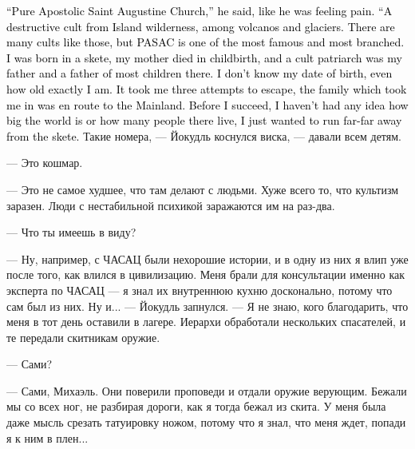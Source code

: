 \documentclass[a4paper,12pt,fleqn]{book}\usepackage{cooltooltips}\usepackage{polyglossia}\setdefaultlanguage[babelshorthands=true]{russian}\setotherlanguage{english}\defaultfontfeatures{Ligatures=TeX,Mapping=tex-text} \usepackage{xcolor}\definecolor{lightgray}{HTML}{bbbbbb}\color{lightgray}\newcommand{\ml}[3]{\textenglish{\textcolor{black}{#3}}}
\begin{document}
\ml{$0$}
{--- Чистоапостольская Церковь Святого Августина, --- сказал он, поморщившись, словно от боли.}
{``Pure Apostolic Saint Augustine Church,'' he said, like he was feeling pain.}
\ml{$0$}
{--- Деструктивный культ в дикой местности Исланда, среди вулканов и ледников.}
{``A destructive cult from Island wilderness, among volcanos and glaciers.}
\ml{$0$}
{Таких культов достаточно много, но ЧАСАЦ --- один из самых известных и разветвлённых.}
{There are many cults like those, but PASAC is one of the most famous and most branched.}
\ml{$0$}
{Я родился в ските, моя мать умерла при родах, а биологическим отцом был глава культа, как и у большинства родившихся там.}
{I was born in a skete, my mother died in childbirth, and a cult patriarch was my father and a father of most children there.}
\ml{$0$}
{Я не знаю, когда я родился и сколько мне в точности лет.}
{I don't know my date of birth, even how old exactly I am.}
\ml{$0$}
{Сбежал с третьей попытки --- меня приютила семья, которая направлялась на Большую Землю.}
{It took me three attempts to escape, the family which took me in was en route to the Mainland.}
\ml{$0$}
{До побега я даже не знал, что вне поселения есть целый мир и множество людей, я просто хотел убежать подальше от скита.}
{Before I succeed, I haven't had any idea how big the world is or how many people there live, I just wanted to run far-far away from the skete.}
Такие номера, --- Йокудль коснулся виска, --- давали всем детям.

--- Это кошмар.

--- Это не самое худшее, что там делают с людьми.
Хуже всего то, что культизм заразен.
Люди с нестабильной психикой заражаются им на раз-два.

--- Что ты имеешь в виду?

--- Ну, например, с ЧАСАЦ были нехорошие истории, и в одну из них я влип уже после того, как влился в цивилизацию.
Меня брали для консультации именно как эксперта по ЧАСАЦ --- я знал их внутреннюю кухню досконально, потому что сам был из них.
Ну и... --- Йокудль запнулся.
--- Я не знаю, кого благодарить, что меня в тот день оставили в лагере.
Иерархи обработали нескольких спасателей, и те передали скитникам оружие.

--- Сами?

--- Сами, Михаэль.
Они поверили проповеди и отдали оружие верующим.
Бежали мы со всех ног, не разбирая дороги, как я тогда бежал из скита.
У меня была даже мысль срезать татуировку ножом, потому что я знал, что меня ждет, попади я к ним в плен...
\end{document}
